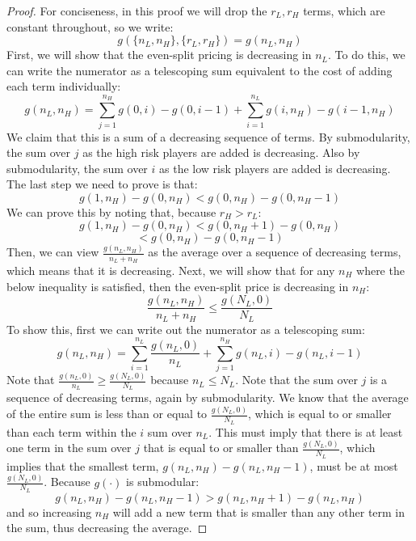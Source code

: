 \documentclass[sigconf]{acmart}
\newcommand{\NL}[0]{\ensuremath{N_L}}
\newcommand{\nL}[0]{\ensuremath{n_L}}
\newcommand{\nH}[0]{\ensuremath{n_H}}
\newcommand{\rL}[0]{\ensuremath{r_L}}
\newcommand{\rH}[0]{\ensuremath{r_H}}
\newcommand{\cost}[0]{\ensuremath{g}}
\newcommand{\cd}[0]{\cdot}
\begin{document}
\begin{proof}
For conciseness, in this proof we will drop the $\rL, \rH$ terms, which are constant throughout, so we write: 
$$\cost(\{\nL, \nH\}, \{\rL, \rH\}) = \cost(\nL, \nH)$$
First, we will show that the even-split pricing is decreasing in $\nL$. To do this, we can write the numerator as a telescoping sum equivalent to the cost of adding each term individually: 
$$\cost(\nL, \nH) = \sum_{j=1}^{\nH}\cost(0, i) - \cost(0, i-1)+\sum_{i=1}^{\nL}\cost(i, \nH) - \cost(i-1, \nH)$$
We claim that this is a sum of a decreasing sequence of terms. By submodularity, the sum over $j$ as the high risk players are added is decreasing. Also by submodularity, the sum over $i$ as the low risk players are added is decreasing. The last step we need to prove is that: 
$$\cost(1, \nH) -\cost(0, \nH)  < \cost(0, \nH) -\cost(0, \nH-1) $$
We can prove this by noting that, because $\rH > \rL$: $$\cost(1, \nH) -\cost(0, \nH) <\cost(0, \nH+1) -\cost(0, \nH)$$
$$<\cost(0, \nH) -\cost(0, \nH-1) $$
Then, we can view $\frac{\cost(\nL, \nH)}{\nL + \nH}$ as the average over a sequence of decreasing terms, which means that it is decreasing. 
Next, we will show that for any $\nH$ where the below inequality is satisfied, then the even-split price is decreasing in $\nH$:
$$\frac{\cost(\nL,\nH)}{\nL + \nH} \leq  \frac{\cost(\NL,0 )}{\NL }$$
To show this, first we can write out the numerator as a telescoping sum: 
$$\cost(\nL, \nH) = \sum_{i=1}^{\nL}\frac{\cost(\nL, 0)}{\nL}+\sum_{j=1}^{\nH}\cost(\nL, i) - \cost(\nL, i-1)$$
Note that $\frac{\cost(\nL, 0)}{\nL} \geq \frac{\cost(\NL, 0)}{\NL}  $ because $\nL \leq \NL$. 
Note that the sum over $j$ is a sequence of decreasing terms, again by submodularity. We know that the average of the entire sum is less than or equal to $\frac{\cost(\NL,0)}{\NL }$, which is equal to or smaller than each term within the $i$ sum over $\nL$. This must imply that there is at least one term in the sum over $j$ that is equal to or smaller than $\frac{\cost(\NL,0)}{\NL}$, which implies that the smallest term, $\cost(\nL, \nH) - \cost(\nL, \nH-1)$, must be at most $\frac{\cost(\NL,0)}{\NL }$. Because $\cost(\cd)$ is submodular:
$$\cost(\nL, \nH) - \cost(\nL, \nH-1)>\cost(\nL, \nH+1) - \cost(\nL, \nH)$$
and so increasing $\nH$ will add a new term that is smaller than any other term in the sum, thus decreasing the average.


\end{proof}
\end{document}
